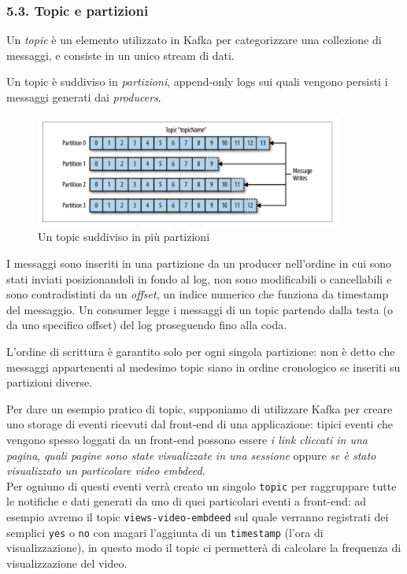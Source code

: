 \documentclass[]{article}
\begin{document}
\newpage

\subsubsection{5.3. Topic e partizioni}\label{topic-e-partizioni}

Un \emph{topic} è un elemento utilizzato in Kafka per categorizzare una
collezione di messaggi, e consiste in un unico stream di dati.

Un topic è suddiviso in \emph{partizioni}, append-only logs sui quali
vengono persisti i messaggi generati dai \emph{producers}.

\begin{figure}
\centering
\includegraphics[width=0.90000\textwidth]{../images/topic-and-partitions.png}
\caption{Un topic suddiviso in più partizioni \label{figure_3}}
\end{figure}

I messaggi sono inseriti in una partizione da un producer nell'ordine in
cui sono stati inviati posizionandoli in fondo al log, non sono
modificabili o cancellabili e sono contradistinti da un \emph{offset},
un indice numerico che funziona da timestamp del messaggio. Un consumer
legge i messaggi di un topic partendo dalla testa (o da uno specifico
offset) del log proseguendo fino alla coda.

L'ordine di scrittura è garantito solo per ogni singola partizione: non
è detto che messaggi appartenenti al medesimo topic siano in ordine
cronologico se inseriti su partizioni diverse.

Per dare un esempio pratico di topic, supponiamo di utilizzare Kafka per
creare uno storage di eventi ricevuti dal front-end di una applicazione:
tipici eventi che vengono spesso loggati da un front-end possono essere
\emph{i link cliccati in una pagina}, \emph{quali pagine sono state
visualizzate in una sessione} oppure \emph{se è stato visualizzato un
particolare video embdeed}.\\
Per ogniuno di questi eventi verrà creato un singolo \texttt{topic} per
raggruppare tutte le notifiche e dati generati da uno di quei
particolari eventi a front-end: ad esempio avremo il topic
\texttt{views-video-embdeed} sul quale verranno registrati dei semplici
\texttt{yes} o \texttt{no} con magari l'aggiunta di un
\texttt{timestamp} (l'ora di visualizzazione), in questo modo il topic
ci permetterà di calcolare la frequenza di visualizzazione del video.
\end{document}
